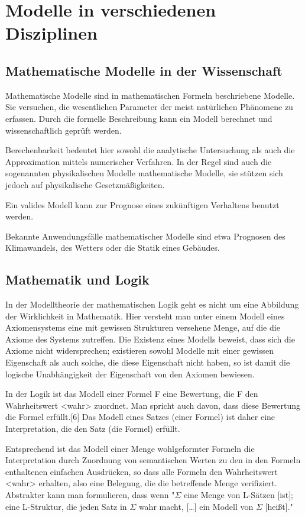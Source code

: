 \documentclass[a4paper, 12pt, pagesize]{scrartcl}
\begin{document}
\section{Modelle in verschiedenen Disziplinen}
\subsection{Mathematische Modelle in der Wissenschaft}
Mathematische Modelle sind in mathematischen Formeln beschriebene Modelle. Sie versuchen, die wesentlichen Parameter der meist natürlichen Phänomene zu erfassen. Durch die formelle Beschreibung kann ein Modell berechnet und wissenschaftlich geprüft werden.

Berechenbarkeit bedeutet hier sowohl die analytische Untersuchung als auch die Approximation mittels numerischer Verfahren. In der Regel sind auch die sogenannten physikalischen Modelle mathematische Modelle, sie stützen sich jedoch auf physikalische Gesetzmäßigkeiten.

Ein valides Modell kann zur Prognose eines zukünftigen Verhaltens benutzt werden.

Bekannte Anwendungsfälle mathematischer Modelle sind etwa Prognosen des Klimawandels, des Wetters oder die Statik eines Gebäudes.

\subsection{Mathematik und Logik}
In der Modelltheorie der mathematischen Logik geht es nicht um eine Abbildung der Wirklichkeit in Mathematik. Hier versteht man unter einem Modell eines Axiomensystems eine mit gewissen Strukturen versehene Menge, auf die die Axiome des Systems zutreffen. Die Existenz eines Modells beweist, dass sich die Axiome nicht widersprechen; existieren sowohl Modelle mit einer gewissen Eigenschaft als auch solche, die diese Eigenschaft nicht haben, so ist damit die logische Unabhängigkeit der Eigenschaft von den Axiomen bewiesen.

In der Logik ist das Modell einer Formel F eine Bewertung, die F den Wahrheitswert <wahr> zuordnet. Man spricht auch davon, dass diese Bewertung die Formel erfüllt.[6] Das Modell eines Satzes (einer Formel) ist daher eine Interpretation, die den Satz (die Formel) erfüllt.

Entsprechend ist das Modell einer Menge wohlgeformter Formeln die Interpretation durch Zuordnung von semantischen Werten zu den in den Formeln enthaltenen einfachen Ausdrücken, so dass alle Formeln den Wahrheitswert <wahr> erhalten, also eine Belegung, die die betreffende Menge verifiziert. Abstrakter kann man formulieren, dass wenn "$Σ$ eine Menge von L-Sätzen [ist]; eine L-Struktur, die jeden Satz in $Σ$ wahr macht, […] ein Modell von $Σ$ [heißt]."
\end{document}
